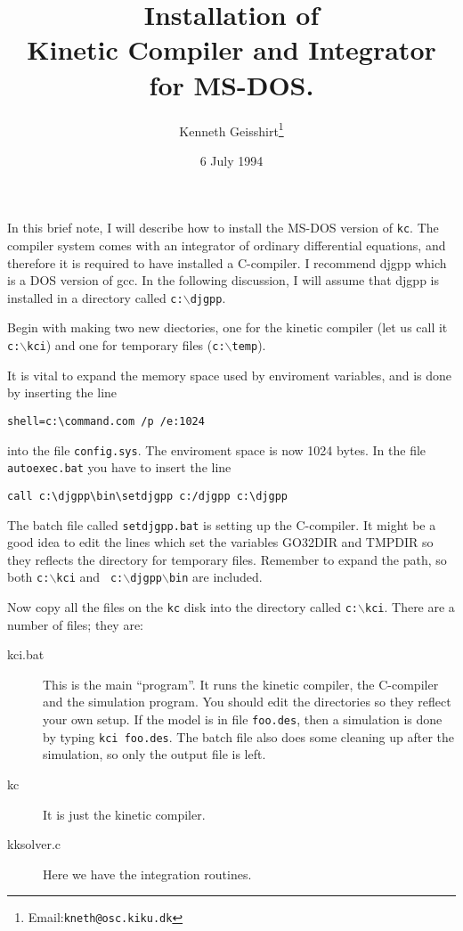 \author{Kenneth Geisshirt\thanks{Email:{\tt kneth@osc.kiku.dk}}}
\title{Installation of \\ Kinetic Compiler and Integrator \\ for
  MS-DOS.}
\date{6 July 1994}

\maketitle
In this brief note, I will describe how to install the MS-DOS version
of {\tt kc}. The compiler system comes with an integrator of ordinary
differential equations, and therefore it is required to have installed
a C-compiler. I recommend djgpp which is a DOS version of gcc. In the
following discussion, I will assume that djgpp is installed in a
directory called {\tt c:$\backslash$djgpp}.

Begin with making two new diectories, one for the kinetic compiler
(let us call it {\tt c:$\backslash$kci}) and one for temporary files
({\tt c:$\backslash$temp}). 

It is vital to expand the memory space used by enviroment variables,
and is done by inserting the line 

\begin{verbatim}
shell=c:\command.com /p /e:1024
\end{verbatim}

\noindent
into the file {\tt config.sys}. The enviroment space is now 1024
bytes. In the file {\tt autoexec.bat} you have to insert the line

\begin{verbatim}
call c:\djgpp\bin\setdjgpp c:/djgpp c:\djgpp
\end{verbatim}

The batch file called {\tt setdjgpp.bat} is setting up the C-compiler.
It might be a good idea to edit the lines which set the variables
GO32DIR and TMPDIR so they reflects the directory for temporary files.
Remember to expand the path, so both {\tt c:$\backslash$kci} and {\tt
  c:$\backslash$djgpp$\backslash$bin} are included.

Now copy all the files on the {\tt kc} disk into the directory called
{\tt c:$\backslash$kci}. There are a number of files; they are:

\begin{description}
\item[kci.bat] This is the main ``program''. It runs the kinetic
  compiler, the C-compiler and the simulation program. You should edit
  the directories so they reflect your own setup. If the model is in
  file {\tt foo.des}, then a simulation is done by typing {\tt kci
    foo.des}. The batch file also does some cleaning up after the
  simulation, so only the output file is left.
\item[kc] It is just the kinetic compiler.
\item[kksolver.c] Here we have the integration routines.
\end{description}


